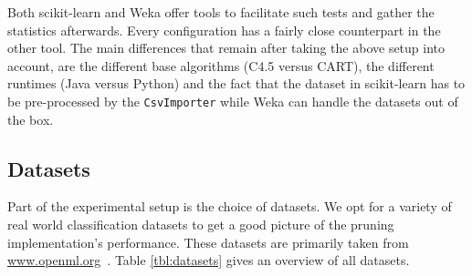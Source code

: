 Both scikit-learn and Weka offer tools to facilitate such tests and gather the statistics afterwards. Every configuration has a fairly close counterpart in the other tool. The main differences that remain after taking the above setup into account, are the different base algorithms (C4.5 versus CART), the different runtimes (Java versus Python) and the fact that the dataset in scikit-learn has to be pre-processed by the \texttt{CsvImporter} while Weka can handle the datasets out of the box.

\subsection{Datasets}
\label{ssec:datasets}
Part of the experimental setup is the choice of datasets. We opt for a variety of real world classification datasets to get a good picture of the pruning implementation's performance. These datasets are primarily taken from \url{www.openml.org}~\cite{openml}. Table \ref{tbl:datasets} gives an overview of all datasets.

